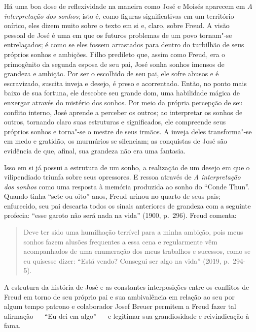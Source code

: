 Há uma boa dose de reflexividade na maneira como José e Moisés aparecem
em \emph{A interpretação dos sonhos}; isto é, como figuras
significativas em um território onírico, eles dizem muito sobre o texto
em si e, claro, sobre Freud. A visão pessoal de José é uma em que os
futuros problemas de um povo tornam"-se entrelaçados; é como se eles
fossem arrastados para dentro do turbilhão de seus próprios sonhos e
ambições. Filho predileto que, assim como Freud, era o primogênito da
segunda esposa de seu pai, José sonha sonhos imensos de grandeza e
ambição. Por ser o escolhido de seu pai, ele sofre abusos e é
escravizado, suscita inveja e desejo, é preso e acorrentado. Então, no
ponto mais baixo de sua fortuna, ele descobre seu grande dom, uma
habilidade mágica de enxergar através do mistério dos sonhos. Por meio
da própria percepção de seu conflito interno, José aprende a perceber os
outros; ao interpretar os sonhos de outros, tornando claro suas
estruturas e significados, ele compreende seus próprios sonhos e
torna"-se o mestre de seus irmãos. A inveja deles transforma"-se em medo e
gratidão, os murmúrios se silenciam; as conquistas de José são evidência
de que, afinal, sua grandeza não era uma fantasia.

Isso em si já possui a estrutura de um sonho, a realização de um desejo
em que o vilipendiado triunfa sobre seus opressores. E ressoa através de
\emph{A interpretação dos sonhos} como uma resposta à memória produzida
ao sonho do ``Conde Thun''. Quando tinha ``sete ou oito'' anos, Freud
urinou no quarto de seus pais; enfurecido, seu pai descarta todos os
sinais anteriores de grandeza com a seguinte profecia: ``esse garoto não
será nada na vida'' (1900, p.~296). Freud comenta:

\begin{quote}
Deve ter sido uma humilhação terrível para a minha ambição, pois meus
sonhos fazem alusões frequentes a essa cena e regularmente vêm
acompanhados de uma enumeração dos meus trabalhos e sucessos, como se eu
quisesse dizer: ``Está vendo? Consegui ser algo na vida'' (2019, p.~294-5).
\end{quote}

A estrutura da história de José e as constantes interposições entre os
conflitos de Freud em torno de seu próprio pai e sua ambivalência em
relação ao seu por algum tempo patrono e colaborador Josef Breuer
permitem a Freud fazer tal afirmação --- ``Eu dei em algo'' --- e legitimar
sua grandiosidade e reivindicação à fama.

